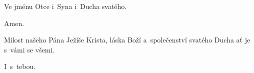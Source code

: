 \mbox{}

Ve jménu Otce i~Syna \grecross{} i~Ducha svatého.

\Rbardot{} Amen.
	   	
\Vbardot{} Milost našeho Pána Ježíše Krista, láska Boží a~společenství svatého Ducha ať
je s~vámi se všemi.

\Rbardot{} I~s~tebou.
